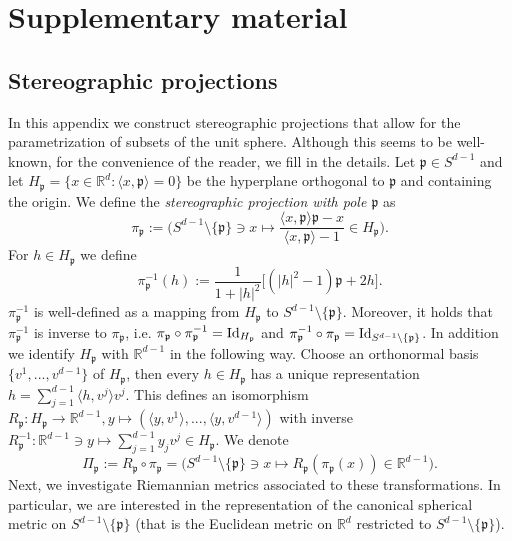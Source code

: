 \documentclass[12pt,a4paper, reqno]{amsart}
\theoremstyle{plain}
\theoremstyle{definition}
\theoremstyle{remark}
\numberwithin{equation}{section}
\newcommand{\1}{\mathbbm{1}}
\newcommand{\R}{\ensuremath{\mathbb{R}}}
\begin{document}
\appendix
\section{Supplementary material}
\subsection{Stereographic projections}\label{appendix:stereographic:projection}
In this appendix we construct  stereographic projections that allow for the parametrization of subsets of the unit sphere. Although this seems to be well-known, for the convenience of the reader, we fill in the details. 
Let $ \mathfrak p\in S^{d-1}$ and let $H_{\mathfrak p} = \{x\in \R^d\colon \langle x,\mathfrak p\rangle =0\}$ be the hyperplane orthogonal to $\mathfrak p$ and containing the origin.  
We define the \emph{stereographic projection with pole $\mathfrak p$} as 
\[\pi_{\mathfrak p}:= \Big( S^{d-1}\setminus\{ \mathfrak p\} \ni x \mapsto \frac{\langle x,\mathfrak p\rangle \mathfrak p -x}{\langle x,\mathfrak p\rangle -1} \in H_{\mathfrak p}\Big).\]
For $h \in H_{\mathfrak p}$ we define 
\[ \pi_{\mathfrak p}^{-1}(h):= \frac{1}{1+|h|^2}\big[ (|h|^2-1)\mathfrak p+2h\big].\]
 $\pi_{\mathfrak p}^{-1}$ is well-defined as a mapping from $H_{\mathfrak p}$ to $S^{d-1}\setminus\{\mathfrak p\}$.  Moreover, it holds  that $\pi_\mathfrak{p}^{-1}$ is inverse to $\pi_\mathfrak{p}$, i.e. $\pi_\mathfrak{p}\circ \pi_\mathfrak{p}^{-1} =\textup{Id}_{H_\mathfrak{p}}$ and $\pi^{-1}_\mathfrak{p}\circ\pi_\mathfrak{p} = \textup{Id}_{S^{d-1}\setminus\{\mathfrak{p}\}}$. 
In addition we identify $H_\mathfrak{p}$ with $\R^{d-1}$ in the following way. 
Choose an orthonormal basis $\{v^1,...,v^{d-1}\}$ of $H_\mathfrak{p}$, then every $h\in H_\mathfrak{p}$ has a unique representation $h= \sum_{j=1}^{d-1} \langle h,v^j\rangle v^j. $
This defines an isomorphism $R_\mathfrak{p}\colon H_\mathfrak{p}\rightarrow \R^{d-1}, y\mapsto (\langle y,v^1\rangle,...,\langle y,v^{d-1}\rangle)$ with inverse $R_\mathfrak{p}^{-1}\colon \R^{d-1}\ni y \mapsto  \sum_{j=1}^{d-1} y_j v^j\in H_\mathfrak{p}$. 
We denote 
\[\Pi_\mathfrak{p}:= R_\mathfrak{p}\circ \pi_\mathfrak{p}=\Big(S^{d-1}\setminus\{\mathfrak{p}\}\ni x \mapsto R_\mathfrak{p}(\pi_\mathfrak{p}(x)) \in \R^{d-1}\Big).\]
Next, we investigate Riemannian metrics associated to these transformations. In particular, we are interested in the representation of the canonical spherical metric on $S^{d-1}\setminus\{\mathfrak{p}\}$ (that is the Euclidean metric on $\R^d$ restricted to $S^{d-1}\setminus\{\mathfrak{p}\}$).
\end{document}
